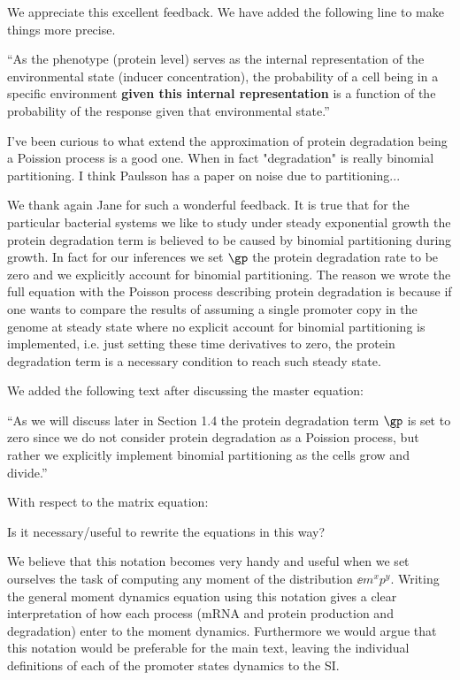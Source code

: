 We appreciate this excellent feedback. We have added the following line to
make things more precise.

``As the phenotype (protein level) serves as the internal representation of the
environmental state (inducer concentration), the probability of a cell being in
a specific environment \textbf{given this internal representation} is a function
of the probability of the response given that environmental state.''

\begin{tcolorbox}
I've been curious to what extend the approximation of protein degradation being
a Poission process is a good one. When in fact "degradation" is really binomial
partitioning. I think Paulsson has a paper on noise due to partitioning...
\end{tcolorbox}

We thank again Jane for such a wonderful feedback. It is true that for the
particular bacterial systems we like to study under steady exponential growth
the protein degradation term is believed to be caused by binomial partitioning
during growth. In fact for our inferences we set $\gp$ the protein degradation
rate to be zero and we explicitly account for binomial partitioning. The reason
we wrote the full equation with the Poisson process describing protein
degradation is because if one wants to compare the results of assuming a single
promoter copy in the genome at steady state where no explicit account for
binomial partitioning is implemented, i.e. just setting these time derivatives
to zero, the protein degradation term is a necessary condition to reach such
steady state.

We added the following text after discussing the master equation:

``As we will discuss later in Section 1.4 the protein degradation term $\gp$ is
set to zero since we do not consider protein degradation as a Poission process,
but rather we explicitly implement binomial partitioning as the cells grow and
divide.''

\begin{tcolorbox}
With respect to the matrix equation:

Is it necessary/useful to rewrite the equations in this way?
\end{tcolorbox}

We believe that this notation becomes very handy and useful when we set
ourselves the task of computing any moment of the distribution $\ee{m^x p^y}$.
Writing the general moment dynamics equation using this notation gives a clear
interpretation of how each process (mRNA and protein production and degradation)
enter to the moment dynamics. Furthermore we would argue that this notation
would be preferable for the main text, leaving the individual definitions of
each of the promoter states dynamics to the SI.

